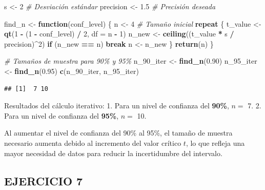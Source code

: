 \documentclass[
]{article}
\newenvironment{Shaded}{\begin{snugshade}}{\end{snugshade}}
\newcommand{\AttributeTok}[1]{\textcolor[rgb]{0.13,0.29,0.53}{#1}}
\newcommand{\CommentTok}[1]{\textcolor[rgb]{0.56,0.35,0.01}{\textit{#1}}}
\newcommand{\ControlFlowTok}[1]{\textcolor[rgb]{0.13,0.29,0.53}{\textbf{#1}}}
\newcommand{\DecValTok}[1]{\textcolor[rgb]{0.00,0.00,0.81}{#1}}
\newcommand{\FloatTok}[1]{\textcolor[rgb]{0.00,0.00,0.81}{#1}}
\newcommand{\FunctionTok}[1]{\textcolor[rgb]{0.13,0.29,0.53}{\textbf{#1}}}
\newcommand{\NormalTok}[1]{#1}
\newcommand{\OtherTok}[1]{\textcolor[rgb]{0.56,0.35,0.01}{#1}}
\newcommand{\SpecialCharTok}[1]{\textcolor[rgb]{0.81,0.36,0.00}{\textbf{#1}}}
\begin{document}
\begin{Shaded}
\begin{Highlighting}[]
\NormalTok{s }\OtherTok{\textless{}{-}} \DecValTok{2}          \CommentTok{\# Desviación estándar}
\NormalTok{precision }\OtherTok{\textless{}{-}} \FloatTok{1.5}  \CommentTok{\# Precisión deseada}

\NormalTok{find\_n }\OtherTok{\textless{}{-}} \ControlFlowTok{function}\NormalTok{(conf\_level) \{}
\NormalTok{  n }\OtherTok{\textless{}{-}} \DecValTok{4}  \CommentTok{\# Tamaño inicial}
  \ControlFlowTok{repeat}\NormalTok{ \{}
\NormalTok{    t\_value }\OtherTok{\textless{}{-}} \FunctionTok{qt}\NormalTok{(}\DecValTok{1} \SpecialCharTok{{-}}\NormalTok{ (}\DecValTok{1} \SpecialCharTok{{-}}\NormalTok{ conf\_level) }\SpecialCharTok{/} \DecValTok{2}\NormalTok{, }\AttributeTok{df =}\NormalTok{ n }\SpecialCharTok{{-}} \DecValTok{1}\NormalTok{)}
\NormalTok{    n\_new }\OtherTok{\textless{}{-}} \FunctionTok{ceiling}\NormalTok{((t\_value }\SpecialCharTok{*}\NormalTok{ s }\SpecialCharTok{/}\NormalTok{ precision)}\SpecialCharTok{\^{}}\DecValTok{2}\NormalTok{)}
    \ControlFlowTok{if}\NormalTok{ (n\_new }\SpecialCharTok{==}\NormalTok{ n) }\ControlFlowTok{break}
\NormalTok{    n }\OtherTok{\textless{}{-}}\NormalTok{ n\_new}
\NormalTok{  \}}
  \FunctionTok{return}\NormalTok{(n)}
\NormalTok{\}}

\CommentTok{\# Tamaños de muestra para 90\% y 95\%}
\NormalTok{n\_90\_iter }\OtherTok{\textless{}{-}} \FunctionTok{find\_n}\NormalTok{(}\FloatTok{0.90}\NormalTok{)}
\NormalTok{n\_95\_iter }\OtherTok{\textless{}{-}} \FunctionTok{find\_n}\NormalTok{(}\FloatTok{0.95}\NormalTok{)}
\FunctionTok{c}\NormalTok{(n\_90\_iter, n\_95\_iter)}
\end{Highlighting}
\end{Shaded}

\begin{verbatim}
## [1]  7 10
\end{verbatim}

Resultados del cálculo iterativo:
1. Para un nivel de confianza del \textbf{90\%}, \(n =\) 7.
2. Para un nivel de confianza del \textbf{95\%}, \(n =\) 10.

Al aumentar el nivel de confianza del 90\% al 95\%, el tamaño de muestra necesario aumenta debido al incremento del valor crítico \(t\), lo que refleja una mayor necesidad de datos para reducir la incertidumbre del intervalo.

\subsection{EJERCICIO 7}\label{ejercicio-7-3}
\end{document}
